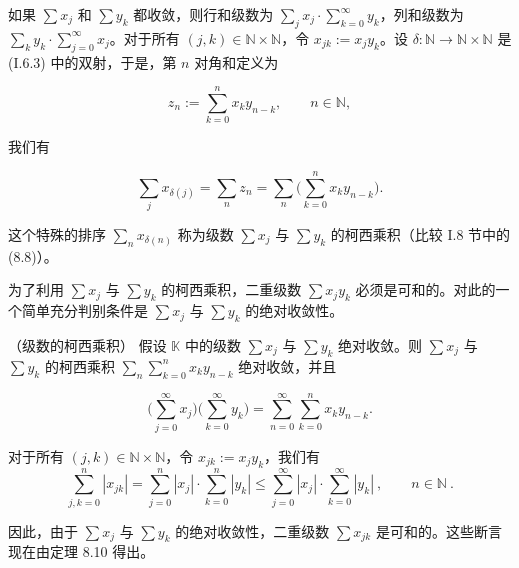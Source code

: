 如果 $\sum x_j$ 和 $\sum y_k$ 都收敛，则行和级数为 $\sum_j x_j \cdot \sum_{k=0}^{\infty} y_k$，列和级数为 $\sum_k y_k \cdot \sum_{j=0}^{\infty} x_j$。对于所有 $(j, k) \in \mathbb{N} \times \mathbb{N}$，令 $x_{jk} := x_j y_k$。设 $\delta: \mathbb{N} \to \mathbb{N} \times \mathbb{N}$ 是 (I.6.3) 中的双射，于是，第 $n$ 对角和定义为

\begin{equation}
z_{n}:=\sum_{k=0}^{n}x_{k}y_{n-k},\qquad n\in\mathbb{N},
\end{equation}

我们有

\[
\sum_{j}x_{\delta(j)}=\sum_{n}z_{n}=\sum_{n}\biggl(\sum_{k=0}^{n}x_{k}y_{n-k}\biggr).
\]

这个特殊的排序 $ \sum_n x_{\delta(n)} $ 称为级数 $ \sum x_j $ 与 $ \sum y_k $ 的柯西乘积（比较 I.8 节中的 (8.8)）。

为了利用 $\sum x_j$ 与 $\sum y_k$ 的柯西乘积，二重级数 $\sum x_j y_k$ 必须是可和的。对此的一个简单充分判别条件是 $\sum x_j$ 与 $\sum y_k$ 的绝对收敛性。

\begin{theorem}

（级数的柯西乘积） 假设 $ \mathbb{K} $ 中的级数 $ \sum x_j $ 与 $ \sum y_k $ 绝对收敛。则 $ \sum x_j $ 与 $ \sum y_k $ 的柯西乘积 $ \sum_n \sum_{k=0}^{n} x_k y_{n-k} $ 绝对收敛，并且

\[
\Big(\sum_{j=0}^{\infty}x_{j}\Big)\Big(\sum_{k=0}^{\infty}y_{k}\Big)=\sum_{n=0}^{\infty}\sum_{k=0}^{n}x_{k}y_{n-k}.
\]

\proofhead
对于所有 $ (j, k) \in \mathbb{N} \times \mathbb{N} $，令 $ x_{jk} := x_j y_k $，我们有
\[
\sum_{j,k=0}^{n}\left|x_{j k}\right|=\sum_{j=0}^{n}\left|x_{j}\right|\cdot\sum_{k=0}^{n}\left|y_{k}\right|\leq\sum_{j=0}^{\infty}\left|x_{j}\right|\cdot\sum_{k=0}^{\infty}\left|y_{k}\right|~,\qquad n\in\mathbb{N}~.
\]

因此，由于 $ \sum x_j $ 与 $ \sum y_k $ 的绝对收敛性，二重级数 $ \sum x_{jk} $ 是可和的。这些断言现在由定理 8.10 得出。

\end{theorem}

